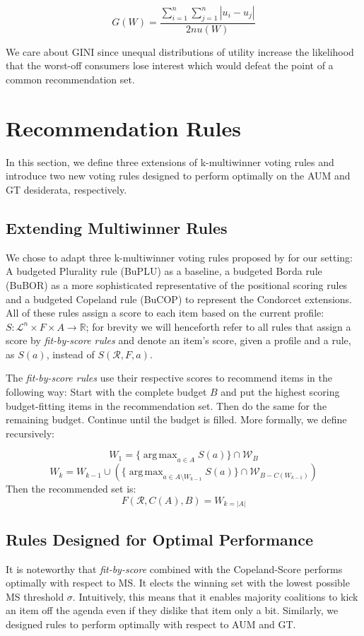 \documentclass{article}
\DeclareMathOperator*{\argmax}{arg\,max}
\begin{document}
\[G(W)=\frac{\displaystyle{\sum_{i=1}^n \sum_{j=1}^n \left| u_i - u_j \right|}}{\displaystyle{2n u(W)}}\]

We care about GINI since unequal distributions of utility increase the likelihood that the worst-off consumers lose interest which would defeat the point of a common recommendation set.

\hypertarget{rules}{\section{Recommendation Rules}}
In this section, we define three extensions of k-multiwinner voting rules and introduce two new voting rules designed to perform optimally on the AUM and GT desiderata, respectively.

\subsection{Extending Multiwinner Rules}

We chose to adapt three k-multiwinner voting rules proposed by  for our setting: A budgeted Plurality rule (BuPLU) as a baseline, a budgeted Borda rule (BuBOR) as a more sophisticated representative of the positional scoring rules and a budgeted Copeland rule (BuCOP) to represent the Condorcet extensions. All of these rules assign a score to each item based on the current profile: $S:\mathcal{L}^n\times F \times A \rightarrow \mathbb{R}$; for brevity we will henceforth refer to all rules that assign a score by \emph{fit-by-score rules} and denote an item's score, given a profile and a rule, as $S(a)$, instead of $S(\mathcal{R}, F, a)$.

The \emph{fit-by-score rules} use their respective scores to recommend items in the following way: Start with the complete budget $B$ and put the highest scoring budget-fitting items in the recommendation set. Then do the same for the remaining budget. Continue until the budget is filled. More formally, we define recursively:

\[W_1=\{\argmax_{a\in A}S(a)\}\cap \mathcal{W}_B\]
\[W_k=W_{k-1}\cup (\{\argmax_{a\in A\setminus W_{k-1}}S(a)\}\cap \mathcal{W}_{B-C(W_{k-1})})\]
Then the recommended set is:
\[F(\mathcal{R},C(A),B)=W_{k=|A|}\]

\subsection{Rules Designed for Optimal Performance}
It is noteworthy that \emph{fit-by-score} combined with the Copeland-Score performs optimally with respect to MS. It elects the winning set with the lowest possible MS threshold $\sigma$. Intuitively, this means that it enables majority coalitions to kick an item off the agenda even if they dislike that item only a bit.
Similarly, we designed rules to perform optimally with respect to AUM and GT.
\end{document}
